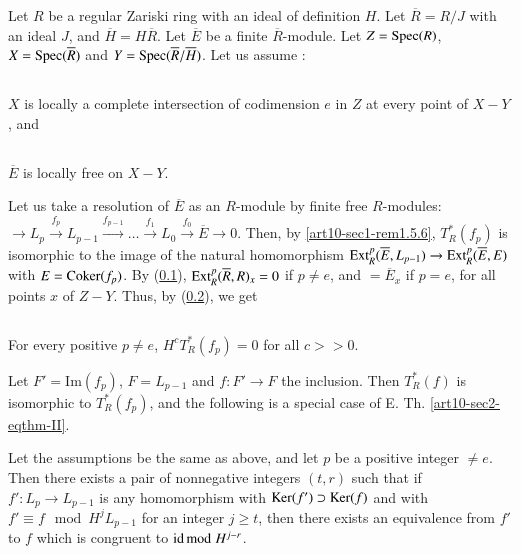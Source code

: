 \begin{romanexam}\label{art10-sec3-exam-III}
Let $R$ be a regular Zariski ring with an ideal of definition $H$. Let $\overline{R}=R/J$ with an ideal $J$, and $\overline{H}=H\overline{R}$. Let $\overline{E}$ be a finite $\overline{R}$-module. Let $Z=\operatorname{\mathrm{Spec}} (R)$, $X=\operatorname{\mathrm{Spec}} (\overline{R})$ and $Y=\operatorname{\mathrm{Spec}} (\overline{R}/\overline{H})$. Let us assume :
\end{romanexam}

\setcounter{subsection}{7}
\subsection{}\label{art10-sec3.8}
$X$ is locally a complete intersection of codimension $e$ in $Z$ at every point of $X-Y$, and

\subsection{}\label{art10-sec3.9}
$\overline{E}$ is locally free on $X-Y$.

Let us take a resolution of $\overline{E}$ as an $R$-module by finite free $R$-modules: $\to L_{p}\xrightarrow{f_{p}}L_{p-1}\xrightarrow{f_{p-1}}\ldots\xrightarrow{f_{1}}L_{0}\xrightarrow{f_{0}}\overline{E}\to 0$. Then, by \ref{art10-sec1-rem1.5.6}, $T^{*}_{R}(f_{p})$ is isomorphic to the image of the natural homomorphism $\operatorname{\mathrm{Ext}}^{p}_{R}(\overline{E},L_{p-1})\to \operatorname{\mathrm{Ext}}^{p}_{R}(\overline{E},E)$ with $E=\operatorname{\mathrm{Coker}} (f_{p})$. By (\ref{art10-sec3.8}), $\operatorname{\mathrm{Ext}}^{p}_{R}(\overline{R},R)_{x}=0$ if $p\neq e$, and $=\overline{E}_{x}$ if $p=e$, for all points $x$ of $Z-Y$. Thus, by (\ref{art10-sec3.9}), we get

\setcounter{subsection}{9}
\subsection{}\label{art10-sec3.10}
For every positive $p\neq e$, $H^{c}T^{*}_{R}(f_{p})=0$ for all $c>>0$.

Let $F'=\text{Im}(f_{p})$, $F=L_{p-1}$ and $f:F'\to F$ the inclusion. Then $T^{*}_{R}(f)$ is isomorphic to $T^{*}_{R}(f_{p})$, and the following is a special case of E. Th. \ref{art10-sec2-eqthm-II}.

\setcounter{theorem}{10}
\begin{theorem}\label{art10-sec3-thm3.11}
Let the assumptions be the same as above, and let $p$ be a positive integer $\neq e$. Then there exists a pair of nonnegative integers $(t,r)$ such that if $f':L_{p}\to L_{p-1}$ is any homomorphism with $\operatorname{\mathrm{Ker}} (f')\supset \operatorname{\mathrm{Ker}} (f)$ and with $f'\equiv f\mod H^{j}L_{p-1}$ for an integer $j\geq t$, then there exists an equivalence from $f'$ to $f$ which is congruent to $\operatorname{\mathrm{id}} {\rm{mod}}\kern.3em H^{j-r}$.
\end{theorem}

